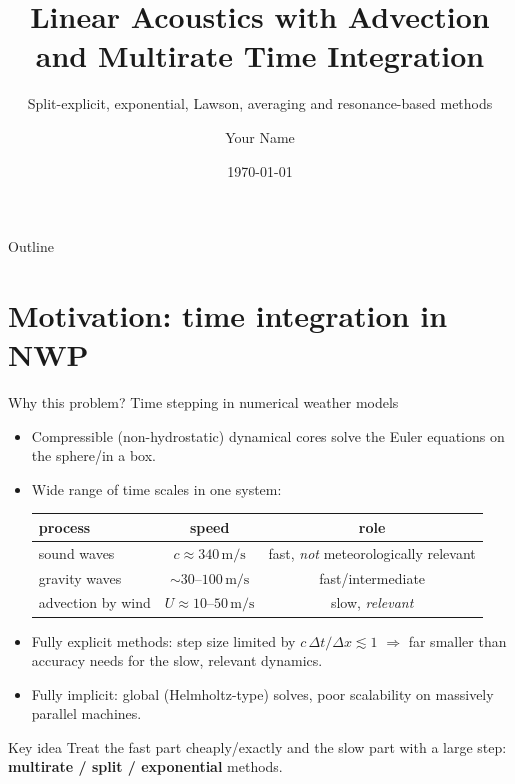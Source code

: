 \documentclass[aspectratio=169,10pt]{beamer}
\title[Acoustics with advection]{Linear Acoustics with Advection\\and Multirate Time Integration}
\subtitle{Split-explicit, exponential, Lawson, averaging and resonance-based methods}
\author{Your Name}
\institute[]{Your Institute}
\date{\today}
\begin{document}
\begin{frame}
  \titlepage
\end{frame}

\begin{frame}{Outline}
  \tableofcontents
\end{frame}

\section{Motivation: time integration in NWP}

\begin{frame}{Why this problem? Time stepping in numerical weather models}
  \begin{itemize}
    \item Compressible (non-hydrostatic) dynamical cores solve the Euler equations on the sphere/in a box.
    \item Wide range of time scales in one system:
    \begin{center}
    \begin{tabular}{lcc}
      \toprule
      process & speed & role\\
      \midrule
      sound waves & $c\approx 340\,\mathrm{m/s}$ & fast, \emph{not} meteorologically relevant\\
      gravity waves & $\sim 30$--$100\,\mathrm{m/s}$ & fast/intermediate\\
      advection by wind & $U\approx 10$--$50\,\mathrm{m/s}$ & slow, \emph{relevant}\\
      \bottomrule
    \end{tabular}
    \end{center}
    \item Fully explicit methods: step size limited by $c\,\Delta t/\Delta x \lesssim 1$ \;$\Rightarrow$\; far smaller than accuracy needs for the slow, relevant dynamics.
    \item Fully implicit: global (Helmholtz-type) solves, poor scalability on massively parallel machines.
  \end{itemize}
  \vspace{0.5em}
  \begin{alertblock}{Key idea}
    Treat the fast part cheaply/exactly and the slow part with a large step: \textbf{multirate / split / exponential} methods.
  \end{alertblock}
\end{frame}
\end{document}
